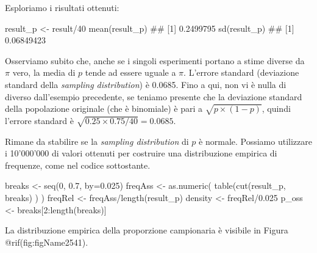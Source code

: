 \documentclass[a4paper,12pt,oneside]{book}
\newenvironment{Shaded}{}{}
\newcommand{\KeywordTok}[1]{#1}
\newcommand{\DataTypeTok}[1]{#1}
\newcommand{\DecValTok}[1]{#1}
\newcommand{\FloatTok}[1]{#1}
\newcommand{\StringTok}[1]{#1}
\newcommand{\CommentTok}[1]{#1}
\newcommand{\OperatorTok}[1]{#1}
\newcommand{\NormalTok}[1]{#1}
\begin{document}
Esploriamo i risultati ottenuti:

\begin{Shaded}
\begin{Highlighting}[]
\NormalTok{result_p <-}\StringTok{ }\NormalTok{result}\OperatorTok{/}\DecValTok{40}
\KeywordTok{mean}\NormalTok{(result_p)}
\CommentTok{## [1] 0.2499795}
\KeywordTok{sd}\NormalTok{(result_p)}
\CommentTok{## [1] 0.06849423}
\end{Highlighting}
\end{Shaded}

Osserviamo subito che, anche se i singoli esperimenti portano a stime diverse da \(\pi\) vero, la media di \(p\) tende ad essere uguale a \(\pi\). L'errore standard (deviazione standard della \emph{sampling distribution}) è 0.0685. Fino a qui, non vi è nulla di diverso dall'esempio precedente, se teniamo presente che la deviazione standard della popolazione originale (che è binomiale) è pari a \(\sqrt{p \times (1 - p)}\), quindi l'errore standard è \(\sqrt{0.25 \times 0.75 / 40} = 0.0685\).

Rimane da stabilire se la \emph{sampling distribution} di \(p\) è normale. Possiamo utilizzare i 10'000'000 di valori ottenuti per costruire una distribuzione empirica di frequenze, come nel codice sottostante.

\begin{Shaded}
\begin{Highlighting}[]
\NormalTok{breaks <-}\StringTok{ }\KeywordTok{seq}\NormalTok{(}\DecValTok{0}\NormalTok{, }\FloatTok{0.7}\NormalTok{, }\DataTypeTok{by=}\FloatTok{0.025}\NormalTok{)}
\NormalTok{freqAss <-}\StringTok{ }\KeywordTok{as.numeric}\NormalTok{( }\KeywordTok{table}\NormalTok{(}\KeywordTok{cut}\NormalTok{(result_p, breaks) ) ) }
\NormalTok{freqRel <-}\StringTok{ }\NormalTok{freqAss}\OperatorTok{/}\KeywordTok{length}\NormalTok{(result_p)}
\NormalTok{density <-}\StringTok{ }\NormalTok{freqRel}\OperatorTok{/}\FloatTok{0.025}
\NormalTok{p_oss <-}\StringTok{ }\NormalTok{breaks[}\DecValTok{2}\OperatorTok{:}\KeywordTok{length}\NormalTok{(breaks)]}
\end{Highlighting}
\end{Shaded}

La distribuzione empirica della proporzione campionaria è visibile in Figura @rif(fig:figName2541).
\end{document}
